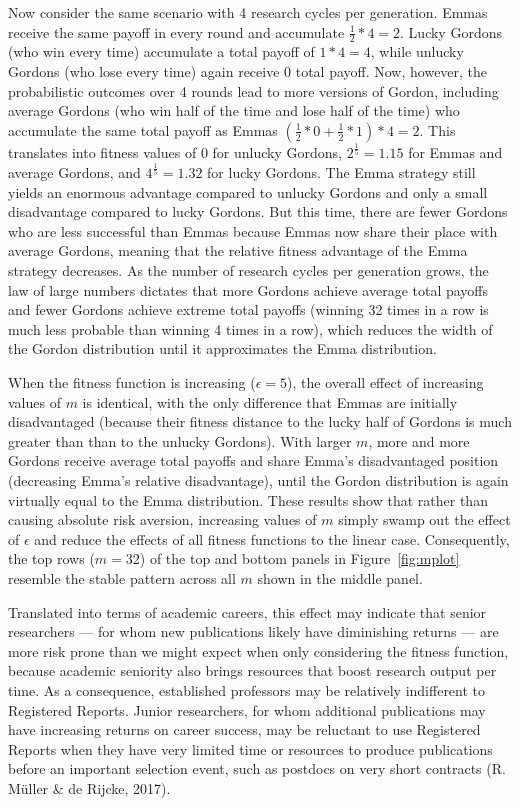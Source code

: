 \documentclass[
  ,man,mask,floatsintext]{apa6}
\begin{document}
Now consider the same scenario with 4 research cycles per generation.
Emmas receive the same payoff in every round and accumulate \(\frac{1}{2} * 4 = 2\).
Lucky Gordons (who win every time) accumulate a total payoff of \(1*4 = 4\), while unlucky Gordons (who lose every time) again receive 0 total payoff.
Now, however, the probabilistic outcomes over 4 rounds lead to more versions of Gordon, including average Gordons (who win half of the time and lose half of the time) who accumulate the same total payoff as Emmas \((\frac{1}{2}*0 + \frac{1}{2}*1)*4 = 2\).
This translates into fitness values of 0 for unlucky Gordons, \(2^{\frac{1}{5}} = 1.15\) for Emmas and average Gordons, and \(4^{\frac{1}{5}} = 1.32\) for lucky Gordons.
The Emma strategy still yields an enormous advantage compared to unlucky Gordons and only a small disadvantage compared to lucky Gordons.
But this time, there are fewer Gordons who are less successful than Emmas because Emmas now share their place with average Gordons, meaning that the relative fitness advantage of the Emma strategy decreases.
As the number of research cycles per generation grows, the law of large numbers dictates that more Gordons achieve average total payoffs and fewer Gordons achieve extreme total payoffs (winning 32 times in a row is much less probable than winning 4 times in a row), which reduces the width of the Gordon distribution until it approximates the Emma distribution.

When the fitness function is increasing (\(\epsilon = 5\)), the overall effect of increasing values of \(m\) is identical, with the only difference that Emmas are initially disadvantaged (because their fitness distance to the lucky half of Gordons is much greater than than to the unlucky Gordons).
With larger \(m\), more and more Gordons receive average total payoffs and share Emma's disadvantaged position (decreasing Emma's relative disadvantage), until the Gordon distribution is again virtually equal to the Emma distribution.
These results show that rather than causing absolute risk aversion, increasing values of \(m\) simply swamp out the effect of \(\epsilon\) and reduce the effects of all fitness functions to the linear case.
Consequently, the top rows (\(m = 32\)) of the top and bottom panels in Figure~\ref{fig:mplot} resemble the stable pattern across all \(m\) shown in the middle panel.

Translated into terms of academic careers, this effect may indicate that senior researchers --- for whom new publications likely have diminishing returns --- are more risk prone than we might expect when only considering the fitness function, because academic seniority also brings resources that boost research output per time.
As a consequence, established professors may be relatively indifferent to Registered Reports.
Junior researchers, for whom additional publications may have increasing returns on career success, may be reluctant to use Registered Reports when they have very limited time or resources to produce publications before an important selection event, such as postdocs on very short contracts (R. Müller \& de Rijcke, 2017).
\end{document}
